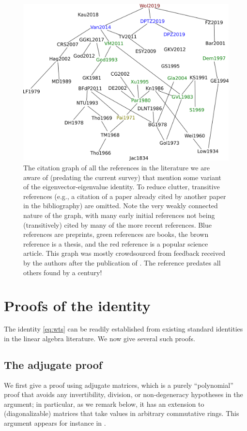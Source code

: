 \documentclass{amsart}
\begin{document}
\begin{figure} [t]
\centering
\includegraphics[width=4.5in]{./citation.png}
\caption{The citation graph of all the references in the literature we are aware of (predating the current survey) that mention some variant of the eigenvector-eigenvalue identity.  To reduce clutter, transitive references (e.g., a citation of a paper already cited by another paper in the bibliography) are omitted.  Note the very weakly connected nature of the graph, with many early initial references not being (transitively) cited by many of the more recent references.  Blue references are preprints, green references are books, the brown reference is a thesis, and the red reference is a popular science article.  This graph was mostly crowdsourced from feedback received by the authors after the publication of \cite{wolchover-2019}.  The reference \cite{jacobi} predates all others found by a century!}
\label{fig:graph}
\end{figure}


\section{Proofs of the identity}

The identity \eqref{eq:wts} can be readily established from existing standard identities in the linear algebra literature.  We now give several such proofs.

\subsection{The adjugate proof}\label{adjugate-sec}

We first give a proof using adjugate matrices, which is a purely ``polynomial'' proof that avoids any invertibility, division, or non-degeneracy hypotheses in the argument; in particular, as we remark below, it has an extension to (diagonalizable) matrices that take values in arbitrary commutative rings.  This argument appears for instance in \cite[Section 7.9]{Parlett}.
\end{document}
